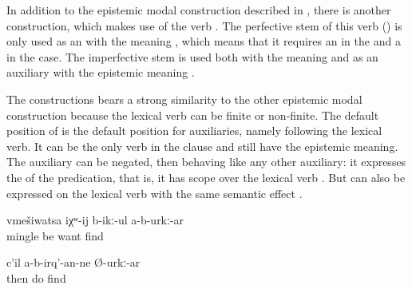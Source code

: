 In addition to the epistemic modal construction described in , there is another construction, which makes use of the verb  . The perfective stem of this verb () is only used as an  with the meaning , which means that it requires an  in the  and a  in the  case. The imperfective stem  is used both with the meaning  and as an auxiliary with the epistemic meaning .

The  constructions bears a strong similarity to the other epistemic modal construction because the lexical verb can be finite or non-finite. The default position of  is the default position for auxiliaries, namely following the lexical verb. It can be the only verb in the clause and still have the epistemic meaning. The auxiliary can be negated, then behaving like any other auxiliary: it expresses the  of the predication, that is, it has scope over the lexical verb . But  can also be expressed on the lexical verb with the same semantic effect .

\begin{exe}
	\ex	\label{ex:(He) probably does not want to get involved}
	\gll	vmešiwatsa	iχʷ-ij	b-ikː-ul	a-b-urkː-ar\\
		mingle	be	want	find\\
	\glt	{}

	\ex	\label{ex:‎Then he will probably not do (this again)}
	\gll	c'il	a-b-irq'-an-ne	Ø-urkː-ar\\
		then	do	find\\
	\glt	{}
\end{exe}

